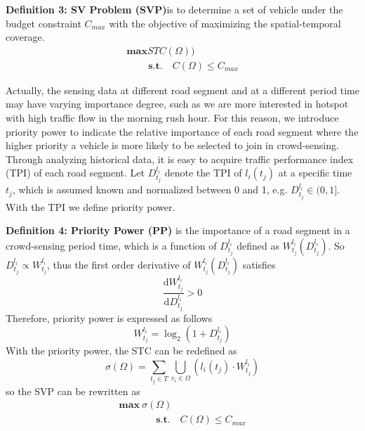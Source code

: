 \documentclass[journal]{IEEEtran}
\begin{document}
\noindent
\textbf{Definition 3: SV Problem (SVP)}is to determine a set of vehicle under the budget constraint $C_{max}$ with the objective of maximizing the spatial-temporal coverage.
\begin{equation}
\begin{matrix}
\textbf{max}STC(\Omega ))\\\quad\quad\
\textbf{s.t.}\quad C(\Omega)\leqslant C_{max}\end{matrix}
\end{equation}

Actually, the sensing data at different road segment and at a different period time may have varying importance degree, such as we are more interested in hotspot with high traffic flow in the morning rush hour. For this reason, we introduce priority power to indicate the relative importance of each road segment where the higher priority a vehicle is more likely to be selected to join in crowd-sensing. Through analyzing historical data, it is easy to acquire traffic performance index (TPI) of each road segment. Let $D_{t_{j}}^{l_{i}}$ denote the TPI of $l_{i} (t_{j})$ at a specific time $t_{j}$, which is assumed known and normalized between 0 and 1, e.g. $D_{t_{j}}^{l_{i}}\in (0,1]$. With the TPI we define priority power.

\noindent
\textbf{Definition 4: Priority Power (PP)} is the importance of a road segment in a crowd-sensing period time, which is a function of  $D_{t_{j}}^{l_{i}}$ defined as $W_{t_{j}}^{l_{i}}(D_{t_{j}}^{l_{i}})$. So $D_{t_{j}}^{l_{i}}\propto W_{t_{j}}^{l_{i}}$, thus the first order derivative of $W_{t_{j}}^{l_{i}}(D_{t_{j}}^{l_{i}})$ satisfies
\begin{equation}
\frac{\mathrm{d}W_{t_{j}}^{l_{i}} }{\mathrm{d}D_{t_{j}}^{l_{i}}}> 0
\end{equation}
Therefore, priority power is expressed as follows
\begin{equation}
W_{t_{j}}^{l_{i}}=\log_{2}(1+D_{t_{j}}^{l_{i}})
\end{equation}
With the priority power, the STC can be redefined as
\begin{equation}
\sigma (\Omega )=\sum_{t_{j}\in T}\bigcup_{v_{i}\in \Omega }(l_{i}(t_{j})\cdot W_{t_{j}}^{l_{i}})
\end{equation}
so the SVP can be rewritten as
\begin{equation}
\begin{matrix}
\textbf{max}\  \sigma(\Omega)\\\quad\quad\quad\;\;\
\textbf{s.t.}\quad C(\Omega)\leqslant C_{max}\end{matrix}
\end{equation}
\end{document}
